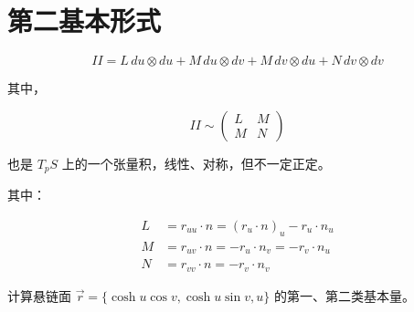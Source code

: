 \documentclass[lang=cn,10pt,thmcnt=section]{elegantbook}
\begin{document}
\section{第二基本形式}
\begin{definition}[ 第二基本形式]
    $$
II = L \, du \otimes du + M \, du \otimes dv + M \, dv \otimes du + N \, dv \otimes dv
$$

其中，

$$
II \sim \begin{pmatrix} L & M \\ M & N \end{pmatrix}
$$

也是 $T_p S$ 上的一个张量积，线性、对称，但不一定正定。

其中：

\begin{align*}
L &= r_{uu} \cdot n = (r_u \cdot n)_u - r_u \cdot n_u \\
M &= r_{uv} \cdot n = -r_u \cdot n_v = -r_v \cdot n_u \\
N &= r_{vv} \cdot n = -r_v \cdot n_v
\end{align*}
\end{definition}
\begin{example}
	计算悬链面 $\vec{r} = \{\cosh u \cos v, \cosh u \sin v, u\}$ 的第一、第二类基本量。
\end{example}
\end{document}
